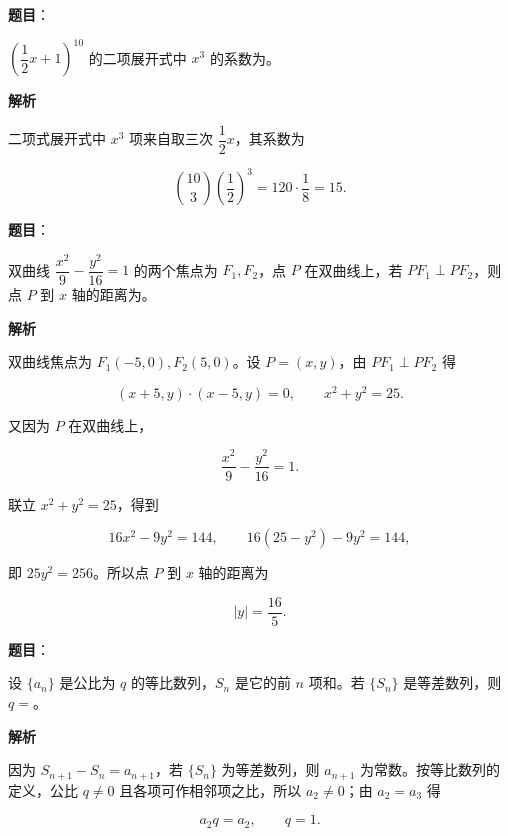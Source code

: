 \begin{answer}

\textbf{题目}：

$\left(\dfrac12x+1\right)^{10}$ 的二项展开式中 $x^3$ 的系数为\gkblank{}。

\textbf{解析}

二项式展开式中 $x^3$ 项来自取三次 $\dfrac12x$，其系数为

\nopagebreak[4]
\[
\binom{10}{3}\left(\frac12\right)^3
=120\cdot\frac18=15.
\]


\end{answer}
\begin{answer}

\textbf{题目}：

双曲线 $\dfrac{x^2}{9}-\dfrac{y^2}{16}=1$ 的两个焦点为 $F_1,F_2$，点 $P$ 在双曲线上，若 $PF_1\perp PF_2$，则点 $P$ 到 $x$ 轴的距离为\gkblank{}。

\textbf{解析}

双曲线焦点为 $F_1(-5,0),F_2(5,0)$。设 $P=(x,y)$，由 $PF_1\perp PF_2$ 得

\nopagebreak[4]
\[
(x+5,y)\cdot(x-5,y)=0,\qquad x^2+y^2=25.
\]

又因为 $P$ 在双曲线上，

\nopagebreak[4]
\[
\frac{x^2}{9}-\frac{y^2}{16}=1.
\]

联立 $x^2+y^2=25$，得到

\nopagebreak[4]
\[
16x^2-9y^2=144,\qquad
16(25-y^2)-9y^2=144,
\]

即 $25y^2=256$。所以点 $P$ 到 $x$ 轴的距离为

\nopagebreak[4]
\[
|y|=\frac{16}{5}.
\]


\end{answer}
\begin{answer}

\textbf{题目}：

设 $\{a_n\}$ 是公比为 $q$ 的等比数列，$S_n$ 是它的前 $n$ 项和。若 $\{S_n\}$ 是等差数列，则 $q=$\gkblank{}。

\textbf{解析}

因为 $S_{n+1}-S_n=a_{n+1}$，若 $\{S_n\}$ 为等差数列，则 $a_{n+1}$ 为常数。按等比数列的定义，公比 $q\ne0$ 且各项可作相邻项之比，所以 $a_2\ne0$；由 $a_2=a_3$ 得

\nopagebreak[4]
\[
a_2q=a_2,\qquad q=1.
\]


\end{answer}
